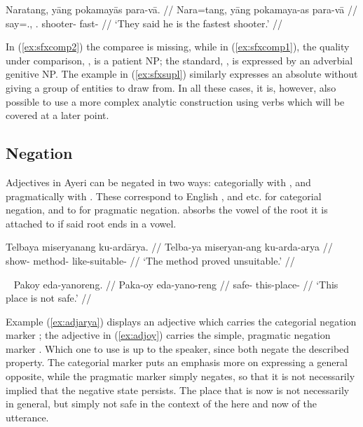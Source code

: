 
\a\label{ex:sfxsupl}\begingl
	\gla Naratang, yāng pokamayās para-vā. //
	\glb Nara=tang, yāng pokamaya-as para-vā //
	\glc say=\TplM{}.\Aarg{}, \TsgM.\Aarg{} shooter-\Parg{} fast-\Supl{} //
	\glft `They said he is the fastest shooter.' //
\endgl\xe

In (\ref{ex:sfxcomp2}) the comparee is missing, while in (\ref{ex:sfxcomp1}),
the quality under comparison, , is a patient NP; the standard, , is expressed
by an adverbial genitive NP. The example in (\ref{ex:sfxsupl}) similarly
expresses an absolute without giving a group of entities to draw from. In all
these cases, it is, however, also possible to use a more complex analytic
construction using verbs which will be covered at a later point.


\subsection{Negation}
\label{subsec:adjneg}

Adjectives in Ayeri can be negated in two ways: categorially with 
, and pragmatically with . These correspond to
English , and  etc. for categorial negation, and to
 for pragmatic negation.  absorbs the vowel of the root 
it is attached to if said root ends in a vowel.

\ex\label{ex:adjarya}\begingl
	\gla Telbaya miseryanang ku-ardārya. //
	\glb Telba-ya miseryan-ang ku-arda-arya //
	\glc show-\TsgM{} method-\Aarg{} like-suitable-\Neg{} //
	\glft `The method proved unsuitable.' //
\endgl\xe

\ex~\label{ex:adjoy}\begingl
	\gla Pakoy eda-yanoreng. //
	\glb Paka-oy eda-yano-reng //
	\glc safe-\Neg{} this-place-\AargI{} //
	\glft `This place is not safe.' //
\endgl\xe

Example (\ref{ex:adjarya}) displays an adjective which carries the categorial
negation marker ; the adjective in (\ref{ex:adjoy}) carries
the simple, pragmatic negation marker . Which one to use is up
to the speaker, since both negate the described property. The categorial marker
puts an emphasis more on expressing a general opposite, while the pragmatic
marker simply negates, so that it is not necessarily implied that the negative
state persists. The place that is  now is not
necessarily  in general, but simply not safe in
the context of the here and now of the utterance.


